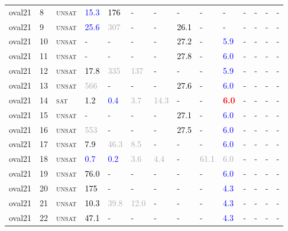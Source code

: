 \begin{center}
{\begin{longtable}{@{}llllllllllllll@{}}
oval21 & 8 & \textsc{unsat} & \textcolor{blue}{15.3} & \textcolor{black}{176} & - & - & - & - & - & - & - & - & - \\
oval21 & 9 & \textsc{unsat} & \textcolor{blue}{25.6} & \textcolor{darkgray}{307} & - & - & \textcolor{black}{26.1} & - & - & - & - & - & - \\
oval21 & 10 & \textsc{unsat} & - & - & - & - & \textcolor{black}{27.2} & - & \textcolor{blue}{5.9} & - & - & - & - \\
oval21 & 11 & \textsc{unsat} & - & - & - & - & \textcolor{black}{27.8} & - & \textcolor{blue}{6.0} & - & - & - & - \\
oval21 & 12 & \textsc{unsat} & \textcolor{black}{17.8} & \textcolor{darkgray}{335} & \textcolor{darkgray}{137} & - & - & - & \textcolor{blue}{5.9} & - & - & - & - \\
oval21 & 13 & \textsc{unsat} & \textcolor{darkgray}{566} & - & - & - & \textcolor{black}{27.6} & - & \textcolor{blue}{6.0} & - & - & - & - \\
oval21 & 14 & \textsc{sat} & \textcolor{black}{1.2} & \textcolor{blue}{0.4} & \textcolor{darkgray}{3.7} & \textcolor{darkgray}{14.3} & - & - & \textbf{\textcolor{red}{6.0}} & - & - & - & - \\
oval21 & 15 & \textsc{unsat} & - & - & - & - & \textcolor{black}{27.1} & - & \textcolor{blue}{6.0} & - & - & - & - \\
oval21 & 16 & \textsc{unsat} & \textcolor{darkgray}{553} & - & - & - & \textcolor{black}{27.5} & - & \textcolor{blue}{6.0} & - & - & - & - \\
oval21 & 17 & \textsc{unsat} & \textcolor{black}{7.9} & \textcolor{darkgray}{46.3} & \textcolor{darkgray}{8.5} & - & - & - & \textcolor{blue}{6.0} & - & - & - & - \\
oval21 & 18 & \textsc{unsat} & \textcolor{blue}{0.7} & \textcolor{blue}{0.2} & \textcolor{darkgray}{3.6} & \textcolor{darkgray}{4.4} & - & \textcolor{darkgray}{61.1} & \textcolor{darkgray}{6.0} & - & - & - & - \\
oval21 & 19 & \textsc{unsat} & \textcolor{black}{76.0} & - & - & - & - & - & \textcolor{blue}{6.0} & - & - & - & - \\
oval21 & 20 & \textsc{unsat} & \textcolor{black}{175} & - & - & - & - & - & \textcolor{blue}{4.3} & - & - & - & - \\
oval21 & 21 & \textsc{unsat} & \textcolor{black}{10.3} & \textcolor{darkgray}{39.8} & \textcolor{darkgray}{12.0} & - & - & - & \textcolor{blue}{4.3} & - & - & - & - \\
oval21 & 22 & \textsc{unsat} & \textcolor{black}{47.1} & - & - & - & - & - & \textcolor{blue}{4.3} & - & - & - & - \\

\end{longtable}}
\end{center}
